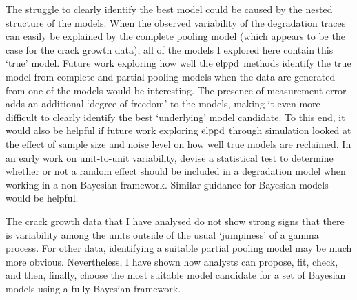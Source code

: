 The struggle to clearly identify the best model could be caused by the nested structure of the models. When the observed variability of the degradation traces can easily be explained by the complete pooling model (which appears to be the case for the crack growth data), all of the models I explored here contain this `true' model. Future work exploring how well the $\hbox{elppd}$ methods identify the true model from complete and partial pooling models when the data are generated from one of the models would be interesting. The presence of measurement error adds an additional `degree of freedom' to the models, making it even more difficult to clearly identify the best `underlying' model candidate. To this end, it would also be helpful if future work exploring $\hbox{elppd}$ through simulation looked at the effect of sample size and noise level on how well true models are reclaimed. In an early work on unit-to-unit variability, \citet{lawless2004} devise a statistical test to determine whether or not a random effect should be included in a degradation model when working in a non-Bayesian framework. Similar guidance for Bayesian models would be helpful.

The crack growth data that I have analysed do not show strong signs that there is variability among the units outside of the usual `jumpiness' of a gamma process. For other data, identifying a suitable partial pooling model may be much more obvious. Nevertheless, I have shown how analysts can propose, fit, check, and then, finally, choose the most suitable model candidate for a set of Bayesian models using a fully Bayesian framework.
